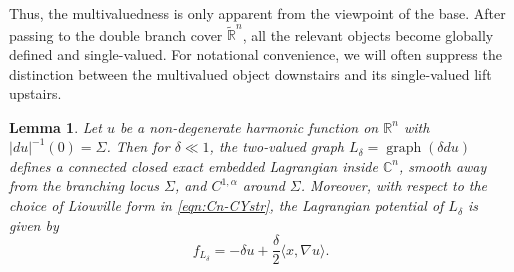 \documentclass[11pt,a4paper]{article}
\numberwithin{equation}{section}%
\newtheorem{lem}[thm]{Lemma}
\theoremstyle{definition}
\newcommand{\R}{\mathbb{R}}
\newcommand{\C}{\mathbb{C}}
\begin{document}
Thus, the multivaluedness is only apparent from the viewpoint of the base. After passing to the double branch cover $\widetilde{\R}^n$, all the relevant objects become globally defined and single-valued. For notational convenience, we will often suppress the distinction between the multivalued object downstairs and its single-valued lift upstairs.

\begin{lem}\label{lem:reg+potential}Let $u$ be a non-degenerate harmonic function on $\R^n$ with $|du|^{-1}(0)=\Sigma$. Then for $\delta\ll 1$, the two-valued graph $L_\delta=\operatorname{graph}(\delta du)$ defines a connected closed exact embedded Lagrangian inside $\C^n$, smooth away from the branching locus $\Sigma$, and $C^{1,\alpha}$ around $\Sigma$. Moreover, with respect to the choice of Liouville form in \eqref{eqn:Cn-CYstr}, the Lagrangian potential of $L_{\delta}$ is given by
    \begin{equation}
        \label{eqn:Lagpotential}
        f_{L_{\delta}}=-\delta u+\frac{\delta}{2}\langle x,\nabla u\rangle.
    \end{equation}
\end{lem}
\end{document}
